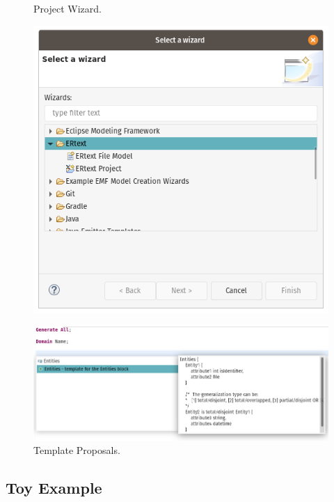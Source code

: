 \begin{figure}[!htb]
  \centering
  \begin{minipage}[b]{0.4\textwidth}
    \caption{Project Wizard.}
    \label{fig:wizard}
    \includegraphics[width=\textwidth]{img/Wizard1.png}
  \end{minipage}
  \hfill
  \begin{minipage}[b]{0.55\textwidth}
    \caption{Template Proposals.}
    \label{fig:templateProposal}
    \includegraphics[width=\textwidth]{img/CodeSnippetRecomendation.png}
  \end{minipage}
\end{figure}

\subsection{Toy Example}



